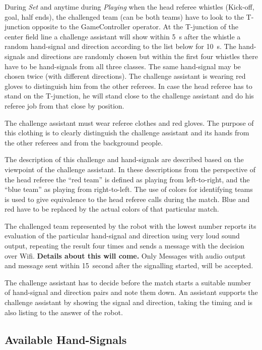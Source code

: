 During \textit{Set} and anytime during \textit{Playing} when the head referee whistles (Kick-off, goal, half ends), the challenged team (can be both teams) have to look to the T-junction opposite to the GameController operator. At the T-junction of the center field line a challenge assistant will show within \qty{5}{\second} after the whistle a random hand-signal and direction according to the list below for \qty{10}{\second}. The hand-signals and directions are randomly chosen but within the first four whistles there have to be hand-signals from all three classes. The same hand-signal may be chosen twice (with different directions). The challenge assistant is wearing red gloves to distinguish him from the other referees. In case the head referee has to stand on the T-junction, he will stand close to the challenge assistant and do his referee job from that close by position.

The challenge assistant must wear referee clothes and red gloves. The purpose of this clothing is to clearly distinguish the challenge assistant and its hands from the other referees and from the background people. 

The description of this challenge and hand-signals are described based on the viewpoint of the challenge assistant. In these descriptions from the perspective of the head referee the ``red team'' is defined as playing from left-to-right, and the ``blue team'' as playing from right-to-left. The use of colors for identifying teams is used to give equivalence to the head referee calls during the match. Blue and red have to be replaced by the actual colors of that particular match.

The challenged team represented by the robot with the lowest number reports its evaluation of the particular hand-signal and direction using very loud sound output, repeating the result four times and sends a message with the decision over Wifi. \textbf{Details about this will come.} Only Messages with audio output and message sent within \qty{15}{second} after the signalling started, will be accepted.

The challenge assistant has to decide before the match starts a suitable number of hand-signal and direction pairs and note them down. An assistant supports the challenge assistant by showing the signal and direction, taking the timing and is also listing to the answer of the robot.

\subsection{Available Hand-Signals}

